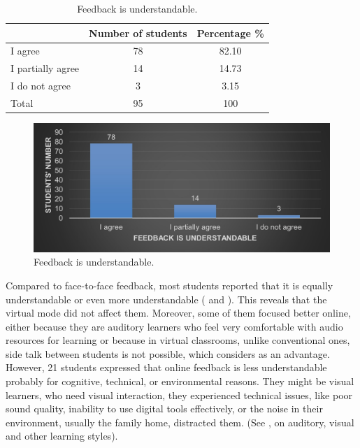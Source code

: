 \documentclass[english]{textolivre}
\begin{document}
\begin{table}[h!]
\centering
\begin{threeparttable}
\caption{Feedback is understandable.}
\label{tbl4}
\centering
\begin{tabular}{p{} c c}
\toprule
 & Number of students & Percentage \% \\ \midrule
I agree & 78 & 82.10 \\
I partially agree & 14 & 14.73 \\
I do not agree & 3 & 3.15 \\
Total & 95 & 100 \\
\bottomrule
\end{tabular}
\end{threeparttable}
\end{table}

\begin{figure}[h!]
 \centering
 \begin{minipage}{.85\textwidth}
 \includegraphics[width=\textwidth]{04.jpg}
 \caption{Feedback is understandable.}
 \label{fig04}
 \end{minipage}
\end{figure}

Compared to face-to-face feedback, most students reported that it is equally understandable or even more understandable ( and ). This reveals that the virtual mode did not affect them. Moreover, some of them focused better online, either because they are auditory learners who feel very comfortable with audio resources for learning or because in virtual classrooms, unlike conventional ones, side talk between students is not possible, which \textcite[p. 828]{ko_teaching_2009} considers as an advantage. However, 21 students expressed that online feedback is less understandable probably for cognitive, technical, or environmental reasons. They might be visual learners, who need visual interaction, they experienced technical issues, like poor sound quality, inability to use digital tools effectively, or the noise in their environment, usually the family home, distracted them. (See \textcite{naqeeb_learning_2011}, on auditory, visual and other learning styles).
\end{document}

